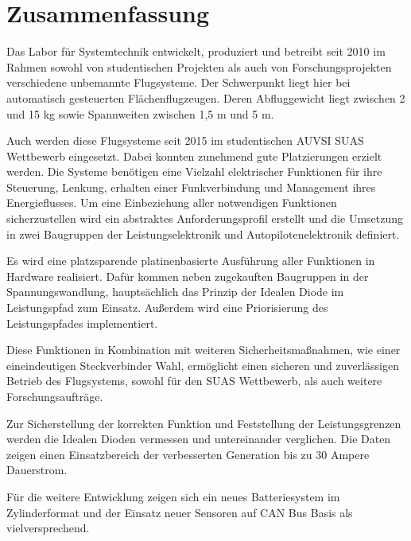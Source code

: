 \chapter*{Zusammenfassung}

Das Labor für Systemtechnik entwickelt, produziert und betreibt seit 2010 im Rahmen sowohl von studentischen Projekten als auch von Forschungsprojekten verschiedene unbemannte Flugsysteme.
Der Schwerpunkt liegt hier bei automatisch gesteuerten Flächenflugzeugen.
Deren Abfluggewicht liegt zwischen 2 und 15 kg sowie Spannweiten zwischen 1,5 m und 5 m.

Auch werden diese Flugsysteme seit 2015 im studentischen AUVSI SUAS Wettbewerb eingesetzt. Dabei konnten zunehmend gute Platzierungen erzielt werden.
Die Systeme benötigen eine Vielzahl elektrischer Funktionen für ihre Steuerung, Lenkung, erhalten einer Funkverbindung und Management ihres Energieflusses.
Um eine Einbeziehung aller notwendigen Funktionen sicherzustellen wird ein abstraktes Anforderungsprofil erstellt und die Umsetzung in zwei Baugruppen der Leistungselektronik und Autopilotenelektronik definiert.

Es wird eine platzsparende platinenbasierte Ausführung aller Funktionen in Hardware realisiert. Dafür kommen neben zugekauften Baugruppen in der Spannungswandlung, hauptsächlich das Prinzip der Idealen Diode im Leistungspfad zum Einsatz. Außerdem wird eine Priorisierung des Leistungspfades implementiert.

Diese Funktionen in Kombination mit weiteren Sicherheitsmaßnahmen, wie einer eineindeutigen Steckverbinder Wahl, ermöglicht einen sicheren und zuverlässigen Betrieb des Flugsystems, sowohl für den SUAS Wettbewerb, als auch weitere Forschungsaufträge.

Zur Sicherstellung der korrekten Funktion und Feststellung der Leistungsgrenzen werden die Idealen Dioden vermessen und untereinander verglichen. Die Daten zeigen einen Einsatzbereich der verbesserten Generation bis zu 30 Ampere Dauerstrom.

Für die weitere Entwicklung zeigen sich ein neues Batteriesystem im Zylinderformat und der Einsatz neuer Sensoren auf CAN Bus Basis als vielversprechend.


